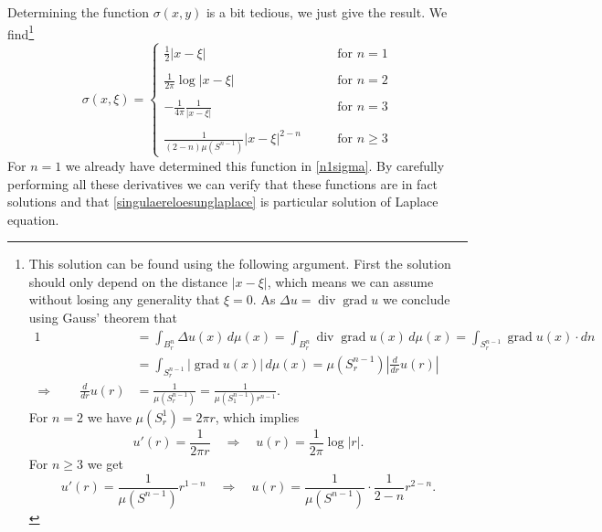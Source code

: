 Determining the function $\sigma(x,y)$ is a bit tedious, we just give the
result.
We find\footnote{%
This solution can be found using the following argument.
First the solution should only depend on the distance $|x-\xi|$, which
means we can assume without losing any generality that $\xi=0$.
As $\Delta u=\operatorname{div}\operatorname{grad}u$ we  conclude using
Gauss' theorem that
\begin{align*}
1&=\int_{B_r^n} \Delta u(x)\,d\mu(x)
=
\int_{B_r^n} \operatorname{div}\operatorname{grad} u(x)\,d\mu(x)
=\int_{S_r^{n-1}}\operatorname{grad}u(x)\cdot dn
\\
&=\int_{S_r^{n-1}}|\operatorname{grad}u(x)|\,d\mu(x)
=\mu(S_r^{n-1})\left|\frac{d}{dr}u(r)\right|
\\
\Rightarrow\qquad\frac{d}{dr}u(r)
&=\frac1{\mu(S_r^{n-1})}
=\frac1{\mu(S_1^{n-1})r^{n-1}}.
\end{align*}
For $n=2$ we have
$\mu(S_r^1)=2\pi r$, which implies
\[
u'(r)=\frac1{2\pi r}\quad\Rightarrow\quad u(r)=\frac1{2\pi}\log|r|.
\]
For $n\ge 3$ we get
\[
u'(r)=\frac1{\mu(S^{n-1})}r^{1-n}\quad\Rightarrow\quad u(r)=\frac1{\mu(S^{n-1})}\cdot \frac1{2-n}r^{2-n}.
\]
}
\begin{equation}
\sigma(x,\xi)=
\begin{cases}
\displaystyle \frac12|x-\xi|
&\qquad \text{for $n=1$}
\\
\\
\displaystyle \frac1{2\pi}\log|x-\xi|
&\qquad \text{for $n=2$}
\\
\\
\displaystyle -\frac1{4\pi}\frac1{|x-\xi|}
&\qquad \text{for $n= 3$}
\\
\\
\displaystyle \frac1{(2-n)\mu(S^{n-1})}|x-\xi|^{2-n}
&\qquad \text{for $n\ge 3$}
\end{cases}
\end{equation}
For $n=1$ we already have determined this function in \eqref{n1sigma}.
By carefully performing all these derivatives we can verify
that these functions are in fact solutions and that
\eqref{singulaereloesunglaplace} is particular solution of
Laplace equation.

